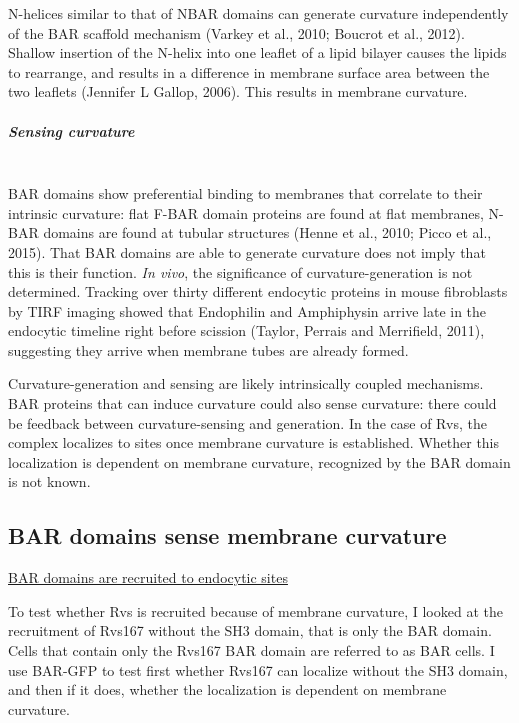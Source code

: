N-helices similar to that of NBAR domains can generate curvature independently of the BAR scaffold mechanism (Varkey et al., 2010; Boucrot et al., 2012). Shallow insertion of the N-helix into one leaflet of a lipid bilayer causes the lipids to rearrange, and results in a difference in membrane surface area between the two leaflets (Jennifer L Gallop, 2006). This results in membrane curvature. 


	
	\vspace{5mm}
\newpage	
				\subparagraph{Sensing curvature }
								\mbox{}\\
BAR domains show preferential binding to membranes that correlate to their intrinsic curvature: flat F-BAR domain proteins are found at flat membranes, N-BAR domains are found at tubular structures (Henne et al., 2010; Picco et al., 2015). That BAR domains are able to generate curvature does not imply that this is their function. \textit{In vivo}, the significance of curvature-generation is not determined. Tracking over thirty different endocytic proteins in mouse fibroblasts by TIRF imaging showed that Endophilin and Amphiphysin arrive late in the endocytic timeline right before scission (Taylor, Perrais and Merrifield, 2011), suggesting they arrive when membrane tubes are already formed. 


	\vspace{5mm}
Curvature-generation and sensing are likely intrinsically coupled mechanisms. BAR proteins that can induce curvature could also sense curvature: there could be feedback between curvature-sensing and generation. In the case of Rvs, the complex localizes to sites once membrane curvature is established. Whether this localization is dependent on membrane curvature, recognized by the BAR domain is not known. 



	\subsection{BAR domains sense membrane curvature}
\label{sub_curvature}
	\vspace{2mm}
\underline{BAR domains are recruited to endocytic sites}

To test whether Rvs is recruited because of membrane curvature, I looked at the recruitment of Rvs167 without the SH3 domain, that is only the BAR domain. Cells that contain only the Rvs167 BAR domain are referred to as BAR cells. I use BAR-GFP to test first whether Rvs167 can localize without the SH3 domain, and then if it does, whether the localization is dependent on membrane curvature.

